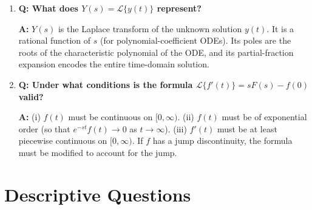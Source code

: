 \documentclass[12pt,a4paper]{article}
\begin{document}
\begin{enumerate}
\item \textbf{Q: What does $Y(s) = \mathcal{L}\{y(t)\}$ represent?}

\textbf{A:} $Y(s)$ is the Laplace transform of the unknown solution
$y(t)$. It is a rational function of $s$ (for polynomial-coefficient
ODEs). Its poles are the roots of the characteristic polynomial of the
ODE, and its partial-fraction expansion encodes the entire time-domain
solution.

\item \textbf{Q: Under what conditions is the formula
$\mathcal{L}\{f'(t)\} = sF(s)-f(0)$ valid?}

\textbf{A:} (i) $f(t)$ must be continuous on $[0,\infty)$. (ii) $f(t)$
must be of exponential order (so that $e^{-st}f(t)\to 0$ as
$t\to\infty$). (iii) $f'(t)$ must be at least piecewise continuous on
$[0,\infty)$. If $f$ has a jump discontinuity, the formula must be
modified to account for the jump.

\end{enumerate}

\section{Descriptive Questions}
\end{document}
